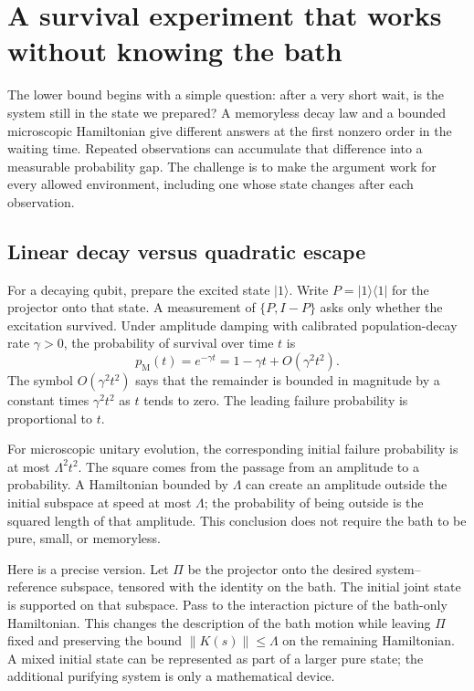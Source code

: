 \documentclass[11pt,a4paper]{article}
\numberwithin{equation}{section}
\theoremstyle{remark}
\begin{document}
\section{A survival experiment that works without knowing the bath}
\label{wit:survival}

The lower bound begins with a simple question: after a very short wait, is
the system still in the state we prepared? A memoryless decay law and a
bounded microscopic Hamiltonian give different answers at the first
nonzero order in the waiting time. Repeated observations can accumulate
that difference into a measurable probability gap. The challenge is to
make the argument work for every allowed environment, including one whose
state changes after each observation.

\subsection{Linear decay versus quadratic escape}

For a decaying qubit, prepare the excited state $|1\rangle$. Write
$P=|1\rangle\langle1|$ for the projector onto that state. A measurement of
$\{P,I-P\}$ asks only whether the excitation survived. Under amplitude
damping with calibrated population-decay rate $\gamma>0$, the probability
of survival over time $t$ is
\begin{equation}
 p_{\mathrm M}(t)=e^{-\gamma t}
 =1-\gamma t+O(\gamma^2t^2).
 \label{wit:linear}
\end{equation}
The symbol $O(\gamma^2t^2)$ says that the remainder is bounded in magnitude
by a constant times $\gamma^2t^2$ as $t$ tends to zero. The leading failure
probability is proportional to $t$.

For microscopic unitary evolution, the corresponding initial failure
probability is at most $\Lambda^2t^2$. The square comes from the passage
from an amplitude to a probability. A Hamiltonian bounded by $\Lambda$
can create an amplitude outside the initial subspace at speed at most
$\Lambda$; the probability of being outside is the squared length of
that amplitude. This conclusion does not require the bath to be pure,
small, or memoryless.

Here is a precise version. Let $\Pi$ be the projector onto the desired
system--reference subspace, tensored with the identity on the bath. The
initial joint state is supported on that subspace. Pass to the
interaction picture of the bath-only Hamiltonian. This changes the
description of the bath motion while leaving $\Pi$ fixed and preserving
the bound $\|K(s)\|\leq\Lambda$ on the remaining Hamiltonian. A mixed
initial state can be represented as part of a larger pure state; the
additional purifying system is only a mathematical device.
\end{document}

